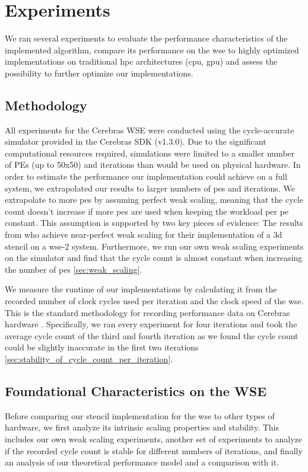 \chapter{Experiments}
\label{sec:experiments}
We ran several experiments to evaluate the performance characteristics of the implemented algorithm, compare its performance on the \ac{wse} to highly optimized implementations on traditional \ac{hpc} architectures (\ac{cpu}, \ac{gpu}) and assess the possibility to further optimize our implementations.

\section{Methodology}
All experiments for the Cerebras WSE were conducted using the cycle-accurate simulator provided in the Cerebras SDK (v1.3.0).
Due to the significant computational resources required, simulations were limited to a smaller number of PEs (up to 50x50) and iterations than would be used on physical hardware.
In order to estimate the performance our implementation could achieve on a full system, we extrapolated our results to larger numbers of \acp{pe} and iterations.
We extrapolate to more \acp{pe} by assuming perfect weak scaling, meaning that the cycle count doesn't increase if more \acp{pe} are used when keeping the workload per \ac{pe} constant.
This assumption is supported by two key pieces of evidence: The results from \citeauthor{jacquelin2022scalable} \cite{jacquelin2022scalable} who achieve near-perfect weak scaling for their implementation of a 3d stencil on a \ac{wse}-2 system.
Furthermore, we run our own weak scaling experiments on the simulator and find that the cycle count is almost constant when increasing the number of \acp{pe} \autoref{sec:weak_scaling}.

We measure the runtime of our implementations by calculating it from the recorded number of clock cycles used per iteration and the clock speed of the \ac{wse}. This is the standard methodology for recording performance data on Cerebras hardware \cite{jacquelin2022scalable}.
Specifically, we ran every experiment for four iterations and took the average cycle count of the third and fourth iteration as we found the cycle count could be slightly inaccurate in the first two iterations \autoref{sec:stability_of_cycle_count_per_iteration}.

\section{Foundational Characteristics on the WSE}
Before comparing our stencil implementation for the \ac{wse} to other types of hardware, we first analyze its intrinsic scaling properties and stability.
This includes our own weak scaling experiments, another set of experiments to analyze if the recorded cycle count is stable for different numbers of iterations, and finally an analysis of our theoretical performance model and a comparison with it. 


